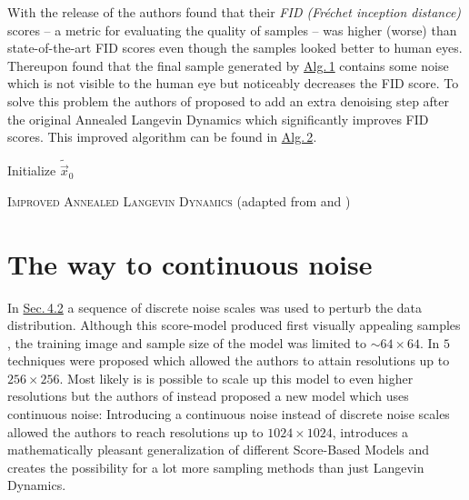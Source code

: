 With the release of \cite{score_1} the authors found that their \textit{FID (Fréchet inception distance)} \cite{fid} scores – a metric for evaluating the quality of samples – was higher (worse) than state-of-the-art FID scores even though the samples looked better to human eyes. Thereupon \cite{score_4} found that the final sample generated by \hyperref[alg:1]{Alg.\,1} contains some noise which is not visible to the human eye but noticeably decreases the FID score. To solve this problem the authors of \cite{score_4} proposed to add an extra denoising step after the original Annealed Langevin Dynamics which significantly improves FID scores. This improved algorithm can be found in \hyperref[alg:2]{Alg.\,2}.
%
\begin{algorithm} \label{alg:2}
    \DontPrintSemicolon
    Initialize $\tilde{\vec{x}}_0$\;
    
    \caption{\textsc{Improved Annealed Langevin Dynamics} (adapted from \cite{score_1} and \cite{score_4})}
\end{algorithm}
\section[The way to continuous noise]{The way to continuous noise%
    } \label{sec:4.4}
In \hyperref[sec:4.2]{Sec.\,4.2} a sequence of discrete noise scales was used to perturb the data distribution. Although this score-model produced first visually appealing samples \cite{score_1}, the training image and sample size of the model was limited to $\sim64\times64$. In \cite{score_2} $5$ techniques were proposed which allowed the authors to attain resolutions up to $256\times256$. Most likely is is possible to scale up this model to even higher resolutions but the authors of \cite{score_3} instead proposed a new model which uses continuous noise: Introducing a continuous noise \cite{score_3} instead of discrete noise scales allowed the authors to reach resolutions up to $1024\times1024$, introduces a mathematically pleasant generalization of different Score-Based Models and creates the possibility for a lot more sampling methods than just Langevin Dynamics.
%
